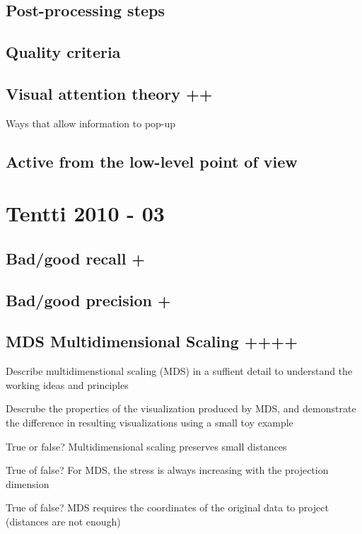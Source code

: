 \documentclass[a4paper]{article}
\begin{document}
\subsection{Post-processing steps}

\subsection{Quality criteria}

\subsection{Visual attention theory ++}

Ways that allow information to pop-up

\subsection{Active from the low-level point of view}

\section{Tentti 2010 - 03}

\subsection{Bad/good recall +}

\subsection{Bad/good precision +}

\subsection{MDS Multidimensional Scaling ++++}

Describe multidimenstional scaling (MDS) in a suffient detail to understand the working ideas and principles

Descrube the properties of the visualization produced by MDS, and demonstrate the difference in resulting visualizations using a small toy example

True or false? Multidimensional scaling preserves small distances

True of false? For MDS, the stress is always increasing with the projection dimension

True of false? MDS requires the coordinates of the original data to project (distances are not enough)
\end{document}
